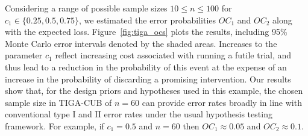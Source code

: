 \documentclass{article} %
\begin{document}
Considering a range of possible sample sizes $10 \leq n \leq 100$ for $c_1 \in \{0.25, 0.5, 0.75\}$, we estimated the error probabilities $OC_1$ and $OC_2$ along with the expected loss. Figure~\ref{fig:tiga_ocs} plots the results, including 95\% Monte Carlo error intervals denoted by the shaded areas. Increases to the parameter $c_1$ reflect increasing cost associated with running a futile trial, and thus lead to a reduction in the probability of this event at the expense of an increase in the probability of discarding a promising intervention. Our results show that, for the design priors and hypotheses used in this example, the chosen sample size in TIGA-CUB of $n=60$ can provide error rates broadly in line with conventional type I and II error rates under the usual hypothesis testing framework. For example, if $c_1=0.5$ and $n=60$ then $OC_1 \approx 0.05$ and $OC_2 \approx 0.1$.
\end{document}
